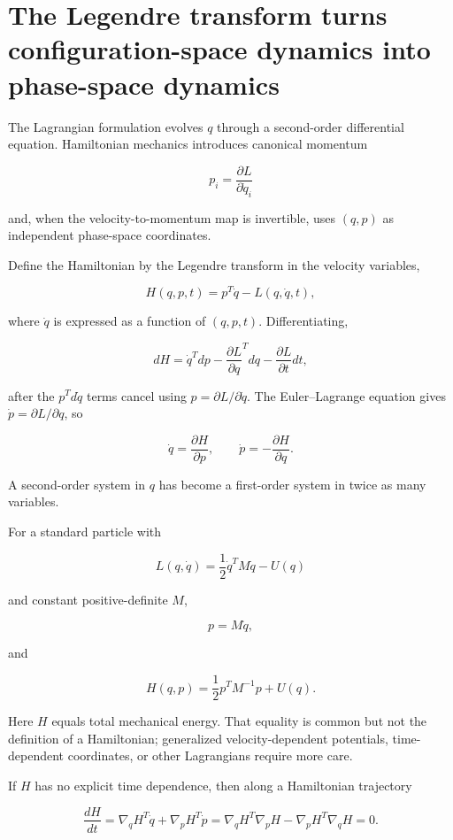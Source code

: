 \section{The Legendre transform turns configuration-space dynamics into phase-space dynamics}\label{02-foundations-ii-ch039-the-legendre-transform-turns-configuration-space-dynamics-into-phase-space-dynamics}

The Lagrangian formulation evolves \(q\) through a second-order differential equation. Hamiltonian mechanics introduces canonical momentum

\[
p_i
=
\frac{\partial L}{\partial\dot q_i}
\]

and, when the velocity-to-momentum map is invertible, uses \((q,p)\) as independent phase-space coordinates.

Define the Hamiltonian by the Legendre transform in the velocity variables,

\[
H(q,p,t)
=
p^T\dot q-L(q,\dot q,t),
\]

where \(\dot q\) is expressed as a function of \((q,p,t)\). Differentiating,

\[
dH
=
\dot q^Tdp
-
\frac{\partial L}{\partial q}^Tdq
-
\frac{\partial L}{\partial t}dt,
\]

after the \(p^Td\dot q\) terms cancel using \(p=\partial L/\partial\dot q\). The Euler--Lagrange equation gives \(\dot p=\partial L/\partial q\), so

\[
\boxed{
\dot q=
\frac{\partial H}{\partial p},
\qquad
\dot p=
-\frac{\partial H}{\partial q}.
}
\]

A second-order system in \(q\) has become a first-order system in twice as many variables.

For a standard particle with

\[
L(q,\dot q)
=
\frac12\dot q^TM\dot q-U(q)
\]

and constant positive-definite \(M\),

\[
p=M\dot q,
\]

and

\[
H(q,p)
=
\frac12p^TM^{-1}p+U(q).
\]

Here \(H\) equals total mechanical energy. That equality is common but not the definition of a Hamiltonian; generalized velocity-dependent potentials, time-dependent coordinates, or other Lagrangians require more care.

If \(H\) has no explicit time dependence, then along a Hamiltonian trajectory

\[
\frac{dH}{dt}
=
\nabla_qH^T\dot q
+
\nabla_pH^T\dot p
=
\nabla_qH^T\nabla_pH
-
\nabla_pH^T\nabla_qH
=
0.
\]

